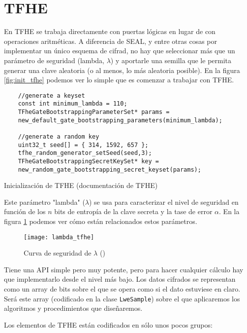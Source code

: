 \section{TFHE}

En TFHE se trabaja directamente con puertas lógicas en lugar de con operaciones aritméticas. A diferencia de SEAL, y entre otras cosas por implementar un único esquema de cifrad, no hay que seleccionar más que un parámetro de seguridad (lambda, $\lambda$) y aportarle una semilla que le permita generar una clave aleatoria (o al menos, lo más aleatoria posible). En la figura \ref{fig:init_tfhe} podemos ver lo simple que es comenzar a trabajar con TFHE.

\begin{listing}
    \begin{verbatim}
    //generate a keyset
    const int minimum_lambda = 110;
    TFheGateBootstrappingParameterSet* params =
    new_default_gate_bootstrapping_parameters(minimum_lambda);
    
    //generate a random key
    uint32_t seed[] = { 314, 1592, 657 };
    tfhe_random_generator_setSeed(seed,3);
    TFheGateBootstrappingSecretKeySet* key = 
    new_random_gate_bootstrapping_secret_keyset(params);
    \end{verbatim}
    \caption{Inicialización de TFHE (documentación de TFHE)}
    \label{fig:init_tfhe}
\end{listing}

Este parámetro "lambda" ($\lambda$) se usa para caracterizar el nivel de seguridad en función de los $n$ bits de entropía de la clave secreta y la tase de error $\alpha$. En la figura \ref{fig:lambda_tfhe} podemos ver cómo están relacionados estos parámetros.

\begin{figure}[h]
    \texttt{[image: lambda\_tfhe]}
    \caption{Curva de seguridad de $\lambda$ (\cite{cheon_faster_2016})}
    \label{fig:lambda_tfhe}
\end{figure}

Tiene una API simple pero muy potente, pero para hacer cualquier cálculo hay que implementarlo desde el nivel más bajo. Los datos cifrados se representan como un array de bits sobre el que se opera como si el dato estuviese en claro. Será este array (codificado en la clase \verb|LweSample|) sobre el que aplicaremos los algoritmos y procedimientos que diseñaremos.

Los elementos de TFHE están codificados en sólo unos pocos grupos:

